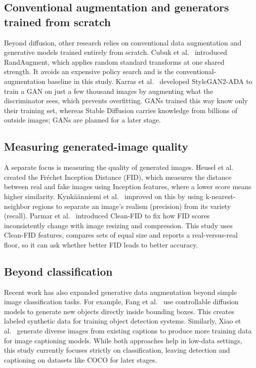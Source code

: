 \documentclass{scrartcl}
\begin{document}
\subsection{Conventional augmentation and generators trained from scratch}
Beyond diffusion, other research relies on conventional data augmentation and generative models trained entirely from scratch. Cubuk et al.~\cite{cubuk2020randaugment} introduced RandAugment, which applies random standard transforms at one shared strength. It avoids an expensive policy search and is the conventional-augmentation baseline in this study. Karras et al.~\cite{karras2020training} developed StyleGAN2-ADA to train a GAN on just a few thousand images by augmenting what the discriminator sees, which prevents overfitting. GANs trained this way know only their training set, whereas Stable Diffusion carries knowledge from billions of outside images; GANs are planned for a later stage.

\subsection{Measuring generated-image quality}
A separate focus is measuring the quality of generated images. Heusel et al.~\cite{heusel2017gans} created the Fréchet Inception Distance (FID), which measures the distance between real and fake images using Inception features, where a lower score means higher similarity. Kynkäänniemi et al.~\cite{kynkaanniemi2019improved} improved on this by using k-nearest-neighbor regions to separate an image's realism (precision) from its variety (recall). Parmar et al.~\cite{parmar2022aliased} introduced Clean-FID to fix how FID scores inconsistently change with image resizing and compression. This study uses Clean-FID features, compares sets of equal size and reports a real-versus-real floor, so it can ask whether better FID leads to better accuracy.

\subsection{Beyond classification}
Recent work has also expanded generative data augmentation beyond simple image classification tasks. For example, Fang et al.~\cite{fang2024data} use controllable diffusion models to generate new objects directly inside bounding boxes. This creates labeled synthetic data for training object detection systems. Similarly, Xiao et al.~\cite{xiao2023multimodal} generate diverse images from existing captions to produce more training data for image captioning models. While both approaches help in low-data settings, this study currently focuses strictly on classification, leaving detection and captioning on datasets like COCO for later stages.
\end{document}
